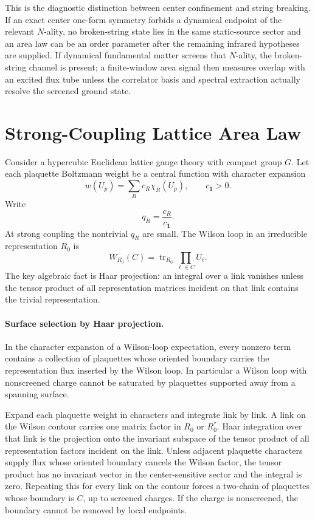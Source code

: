 \begin{controlledapproximation}
This is the diagnostic distinction between center confinement and string
breaking.  If an exact center one-form symmetry forbids a dynamical endpoint of
the relevant \(N\)-ality, no broken-string state lies in the same static-source
sector and an area law can be an order parameter after the remaining infrared
hypotheses are supplied.  If dynamical fundamental matter screens that
\(N\)-ality, the broken-string channel is present; a finite-window area signal
then measures overlap with an excited flux tube unless the correlator basis and
spectral extraction actually resolve the screened ground state.
\end{controlledapproximation}

\section{Strong-Coupling Lattice Area Law}

Consider a hypercubic Euclidean lattice gauge theory with compact group
\(G\).  Let each plaquette Boltzmann weight be a central function with
character expansion
\[
  w(U_p)=\sum_R c_R\chi_R(U_p),
  \qquad c_{\mathbf 1}>0.
\]
Write
\[
  q_R=\frac{c_R}{c_{\mathbf 1}}.
\]
At strong coupling the nontrivial \(q_R\) are small.  The Wilson loop in an
irreducible representation \(R_0\) is
\[
  W_{R_0}(C)=\operatorname{tr}_{R_0}\prod_{\ell\in C} U_\ell .
\]
The key algebraic fact is Haar projection: an integral over a link vanishes
unless the tensor product of all representation matrices incident on that
link contains the trivial representation.

\paragraph{Surface selection by Haar projection.}
In the character expansion of a Wilson-loop expectation, every nonzero term
contains a collection of plaquettes whose oriented boundary carries the
representation flux inserted by the Wilson loop.  In particular a Wilson loop
with nonscreened charge cannot be saturated by plaquettes supported away from
a spanning surface.

Expand each plaquette weight in characters and integrate link by link.  A
link on the Wilson contour carries one matrix factor in \(R_0\) or
\(R_0^*\).  Haar integration over that link is the projection onto the
invariant subspace of the tensor product of all representation factors
incident on the link.  Unless adjacent plaquette characters supply flux whose
oriented boundary cancels the Wilson factor, the tensor product has no
invariant vector in the center-sensitive sector and the integral is zero.
Repeating this for every link on the contour forces a two-chain of plaquettes
whose boundary is \(C\), up to screened charges.  If the charge is
nonscreened, the boundary cannot be removed by local endpoints.

